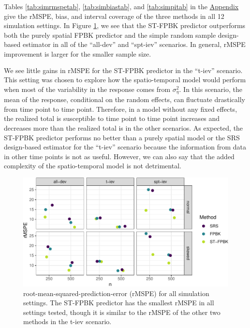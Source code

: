 \documentclass[smallextended]{svjour3}       %
\begin{document}
Tables \ref{tab:simrmspetab}, \ref{tab:simbiastab}, and
\ref{tab:simpitab} in the \protect\hyperlink{appendix}{Appendix} give
the rMSPE, bias, and interval coverage of the three methods in all 12
simulation settings. In Figure \ref{fig:rmspe}, we see that the ST-FPBK
predictor outperforms both the purely spatial FPBK predictor and the
simple random sample design-based estimator in all of the ``all-dev''
and ``spt-iev'' scenarios. In general, rMSPE improvement is larger for
the smaller sample size.

We see little gains in rMSPE for the ST-FPBK predictor in the ``t-iev''
scenario. This setting was chosen to explore how the spatio-temporal
model would perform when most of the variability in the response comes
from \(\sigma^2_{\eta}\). In this scenario, the mean of the response,
conditional on the random effects, can fluctuate drastically from time
point to time point. Therefore, in a model without any fixed effects,
the realized total is susceptible to time point to time point increases
and decreases more than the realized total is in the other scenarios. As
expected, the ST-FPBK predictor performs no better than a purely spatial
model or the SRS design-based estimator for the ``t-iev'' scenario
because the information from data in other time points is not as useful.
However, we can also say that the added complexity of the
spatio-temporal model is not detrimental.

\begin{figure}
\centering
\includegraphics{preprint_springer_files/figure-latex/unnamed-chunk-17-1.pdf}
\caption{\label{fig:rmspe} root-mean-squared-prediction-error (rMSPE)
for all simulation settings. The ST-FPBK predictor has the smallest
rMSPE in all settings tested, though it is similar to the rMSPE of the
other two methods in the t-iev scenario.}
\end{figure}
\end{document}

